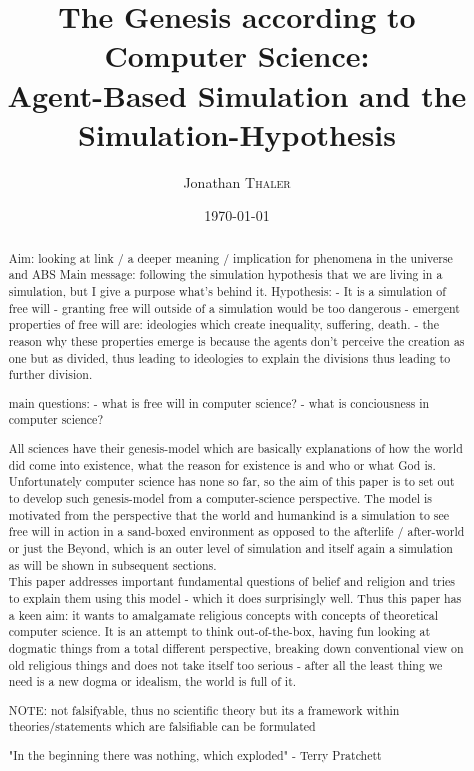 \documentclass{article}
\title{The Genesis according to Computer Science:\\Agent-Based Simulation and the Simulation-Hypothesis} %
\author{Jonathan \textsc{Thaler}} %
\date{\today} %
\begin{document}
\maketitle %

\begin{abstract}
Aim: looking at link / a deeper meaning / implication for phenomena in the universe and ABS
Main message: following the simulation hypothesis that we are living in a simulation, but I give a purpose what's behind it. 
	Hypothesis: 
		- It is a simulation of free will 
		- granting free will outside of a simulation would be too dangerous
		- emergent properties of free will are: ideologies which create inequality, suffering, death. 
		- the reason why these properties emerge is because the agents don't perceive the creation as one but as divided, thus leading to ideologies to explain the divisions thus leading to further division.

main questions: 
	- what is free will in computer science?
	- what is conciousness in computer science?

All sciences have their genesis-model which are basically explanations of how the world did come into existence, what the reason for existence is and who or what God is. Unfortunately computer science has none so far, so the aim of this paper is to set out to develop such genesis-model from a computer-science perspective. The model is motivated from the perspective that the world and humankind is a simulation to see free will in action in a sand-boxed environment as opposed to the afterlife / after-world or just the Beyond, which is an outer level of simulation and itself again a simulation as will be shown in subsequent sections. \\
This paper addresses important fundamental questions of belief and religion and tries to explain them using this model - which it does surprisingly well. Thus this paper has a keen aim: it wants to amalgamate religious concepts with concepts of theoretical computer science. It is an attempt to think out-of-the-box, having fun looking at dogmatic things from a total different perspective, breaking down conventional view on old religious things and does not take itself too serious - after all the least thing we need is a new dogma or idealism, the world is full of it.

NOTE: not falsifyable, thus no scientific theory but its a framework within theories/statements which are falsifiable can be formulated

\bigskip

"In the beginning there was nothing, which exploded" - Terry Pratchett
\end{abstract}
\end{document}
